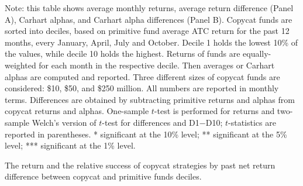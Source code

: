 \documentclass[12pt, a4]{article}
\begin{document}
\begin{landscape}
\begin{table*}[p]
\begin{threeparttable}
			
			
			\label{tab:past_performance_deciles}%
			\begin{tablenotes}
				\tiny
				\item Note: this table shows average monthly returns, average return difference (Panel A), Carhart alphas, and Carhart alpha differences (Panel B). Copycat funds are sorted into deciles, based on primitive fund average \textsc{ATC} return for the past 12 months, every January, April, July and October. Decile 1 holds the lowest 10\% of the values, while decile 10 holds the highest. Returns of funds are equally-weighted for each month in the respective decile. Then averages or Carhart alphas are computed and reported. Three different sizes of copycat funds are considered: \$10, \$50, and \$250 million. All numbers are reported in monthly terms. Differences are obtained by subtracting primitive returns and alphas from copycat returns and alphas. One-sample $t$-test is performed for returns and two-sample Welch's version of $t$-test for differences and D1$-$D10; $t$-statistics are reported in parentheses. * significant at the 10\% level; ** significant at the 5\% level; *** significant at the 1\% level.
			\end{tablenotes}
		\end{threeparttable}
	\end{table*}
	
	\begin{table*}[p] %
		\centering
		\ssmall
		\newcommand{\dspacing}{1ex} %
		\newcommand{\panelspacing}{1.5ex} %
		\newcommand{\decilename}[1]{\multirow{2}{*}{#1}} %
		\newcommand{\mc}[3]{\multicolumn{#1}{#2}{#3}}
		\begin{threeparttable}
			\centering
			\caption{The return and the relative success of copycat strategies by past net return difference between copycat and primitive funds deciles.}
			
			
			

\end{threeparttable}
\end{table*}
\end{landscape}
\end{document}
